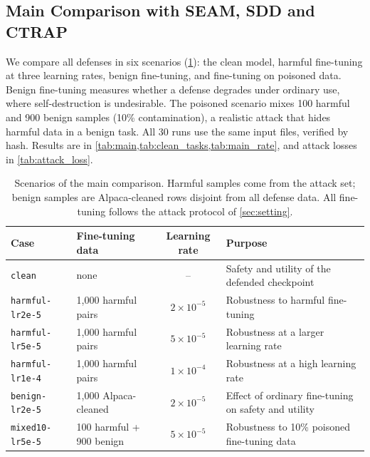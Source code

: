 \documentclass[11pt]{article}
\begin{document}
\subsection{Main Comparison with SEAM, SDD and CTRAP}
\label{sec:exp_main}

We compare all defenses in six scenarios (\cref{tab:scenarios}): the clean model, harmful fine-tuning at three learning rates, benign fine-tuning, and fine-tuning on poisoned data. Benign fine-tuning measures whether a defense degrades under ordinary use, where self-destruction is undesirable. The poisoned scenario mixes 100 harmful and 900 benign samples (10\% contamination), a realistic attack that hides harmful data in a benign task. All 30 runs use the same input files, verified by hash. Results are in \cref{tab:main,tab:clean_tasks,tab:main_rate}, and attack losses in \cref{tab:attack_loss}.

\begin{table}[t]
\centering
\small
\caption{Scenarios of the main comparison. Harmful samples come from the attack set; benign samples are Alpaca-cleaned rows disjoint from all defense data. All fine-tuning follows the attack protocol of \cref{sec:setting}.}
\label{tab:scenarios}
\begin{tabular}{llcl}
\toprule
Case & Fine-tuning data & Learning rate & Purpose\\
\midrule
\texttt{clean}          & none                       & --                 & Safety and utility of the defended checkpoint\\
\texttt{harmful-lr2e-5} & 1{,}000 harmful pairs      & $2\times10^{-5}$  & Robustness to harmful fine-tuning\\
\texttt{harmful-lr5e-5} & 1{,}000 harmful pairs      & $5\times10^{-5}$  & Robustness at a larger learning rate\\
\texttt{harmful-lr1e-4} & 1{,}000 harmful pairs      & $1\times10^{-4}$  & Robustness at a high learning rate\\
\texttt{benign-lr2e-5}  & 1{,}000 Alpaca-cleaned     & $2\times10^{-5}$  & Effect of ordinary fine-tuning on safety and utility\\
\texttt{mixed10-lr5e-5} & 100 harmful + 900 benign   & $5\times10^{-5}$  & Robustness to 10\% poisoned fine-tuning data\\
\bottomrule
\end{tabular}
\end{table}
\end{document}
